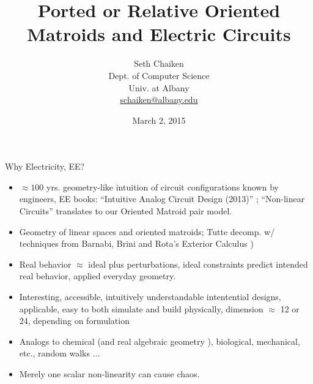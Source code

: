 \documentclass{beamer}
\title{Ported or Relative Oriented Matroids and Electric Circuits}
\author{Seth Chaiken\\
Dept. of Computer Science\\
Univ. at Albany\\
\url{schaiken@albany.edu}
}
\date{March 2, 2015}
\begin{document}
\begin{frame}
 \titlepage
\end{frame}


\begin{frame}{Why Electricity, EE?}
\begin{itemize}
\item $\approx 100$ yrs. geometry-like intuition of
circuit configurations known by engineers, EE books:
``Intuitive Analog Circuit Design (2013)''
\cite{intuitAna}; ``Non-linear Circuits'' \cite{HaslerNeirynck}
translates to our Oriented Matroid pair model.

\item Geometry of linear spaces and oriented matroids;
Tutte decomp. w/
techniques from Barnabi, Brini and Rota's Exterior Calculus 
\cite{exteriorCalc})

\item
Real behavior $\approx$ ideal plus perturbations,
ideal constraints predict intended real behavior,
applied everyday geometry.

\item 
Interesting, accessible, intuitively understandable
intentential designs, applicable,
easy to both simulate and build physically, dimension
$\approx$
12 or 24, depending on formulation
\item
Analogs to chemical (and real algebraic geometry 
\cite{signsInChemRAG}), biological, mechanical, etc., random walks ...
\item
Merely one scalar non-linearity can cause chaos.
\end{itemize}
\end{frame}

\end{document}
